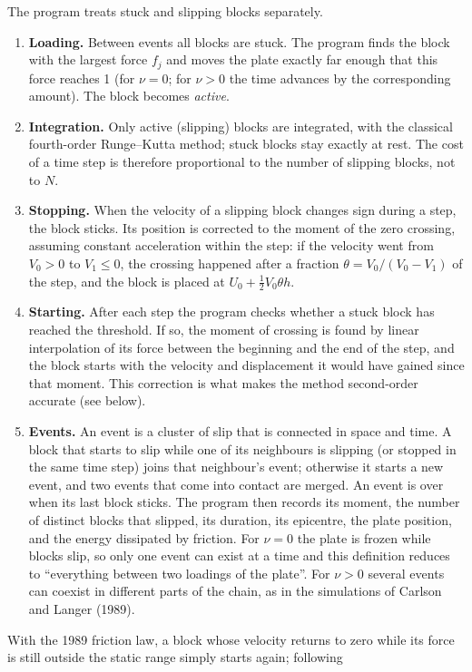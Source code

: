 The program treats stuck and slipping blocks separately.
\begin{enumerate}
  \item \textbf{Loading.} Between events all blocks are stuck. The program finds the block with the largest force $f_j$ and moves the plate
    exactly far enough that this force reaches 1 (for $\nu=0$; for $\nu>0$ the time advances by the corresponding amount). The block becomes
    \emph{active}.
  \item \textbf{Integration.} Only active (slipping) blocks are integrated, with the classical fourth-order Runge--Kutta method; stuck blocks
    stay exactly at rest. The cost of a time step is therefore proportional to the number of slipping blocks, not to $N$.
  \item \textbf{Stopping.} When the velocity of a slipping block changes sign during a step, the block sticks. Its position is corrected to the
    moment of the zero crossing, assuming constant acceleration within the step: if the velocity went from $V_0>0$ to $V_1\le0$, the crossing
    happened after a fraction $\theta = V_0/(V_0-V_1)$ of the step, and the block is placed at $U_0 + \tfrac12V_0\theta h$.
  \item \textbf{Starting.} After each step the program checks whether a stuck block has reached the threshold. If so, the moment of crossing is
    found by linear interpolation of its force between the beginning and the end of the step, and the block starts with the velocity and
    displacement it would have gained since that moment. This correction is what makes the method second-order accurate (see below).
  \item \textbf{Events.} An event is a cluster of slip that is connected in space and time. A block that starts to slip while one of its neighbours is
    slipping (or stopped in the same time step) joins that neighbour's event; otherwise it starts a new event, and two events that come into contact
    are merged. An event is over when its last block sticks. The program then records its moment, the number of distinct blocks that slipped, its
    duration, its epicentre, the plate position, and the energy dissipated by friction. For $\nu = 0$ the plate is frozen while blocks slip, so only
    one event can exist at a time and this definition reduces to ``everything between two loadings of the plate''. For $\nu>0$ several events can
    coexist in different parts of the chain, as in the simulations of Carlson and Langer (1989).
\end{enumerate}
With the 1989 friction law, a block whose velocity returns to zero while its force is still outside the static range simply starts again; following
